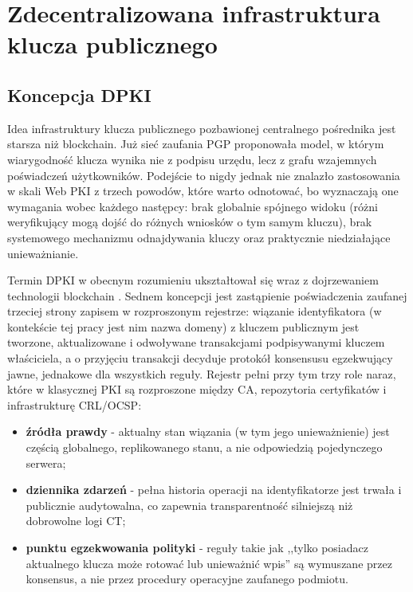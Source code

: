 \chapter{Zdecentralizowana infrastruktura klucza publicznego}
\label{ch:dpki}

\section{Koncepcja DPKI}
\label{sec:koncepcja-dpki}

Idea infrastruktury klucza publicznego pozbawionej centralnego pośrednika jest starsza niż blockchain. Już sieć zaufania PGP \cite{zimmermann1995pgp} proponowała model, w którym wiarygodność klucza wynika nie z podpisu urzędu, lecz z grafu wzajemnych poświadczeń użytkowników. Podejście to nigdy jednak nie znalazło zastosowania w skali Web PKI z trzech powodów, które warto odnotować, bo wyznaczają one wymagania wobec każdego następcy: brak globalnie spójnego widoku (różni weryfikujący mogą dojść do różnych wniosków o tym samym kluczu), brak systemowego mechanizmu odnajdywania kluczy oraz praktycznie niedziałające unieważnianie.

Termin DPKI w obecnym rozumieniu ukształtował się wraz z dojrzewaniem technologii blockchain \cite{allen2015dpki}. Sednem koncepcji jest zastąpienie poświadczenia zaufanej trzeciej strony zapisem w rozproszonym rejestrze: wiązanie identyfikatora (w kontekście tej pracy jest nim nazwa domeny) z kluczem publicznym jest tworzone, aktualizowane i odwoływane transakcjami podpisywanymi kluczem właściciela, a o przyjęciu transakcji decyduje protokół konsensusu egzekwujący jawne, jednakowe dla wszystkich reguły. Rejestr pełni przy tym trzy role naraz, które w klasycznej PKI są rozproszone między CA, repozytoria certyfikatów i infrastrukturę CRL/OCSP:
\begin{itemize}
    \item \textbf{źródła prawdy} - aktualny stan wiązania (w tym jego unieważnienie) jest częścią globalnego, replikowanego stanu, a nie odpowiedzią pojedynczego serwera;
    \item \textbf{dziennika zdarzeń} - pełna historia operacji na identyfikatorze jest trwała i publicznie audytowalna, co zapewnia transparentność silniejszą niż dobrowolne logi CT;
    \item \textbf{punktu egzekwowania polityki} - reguły takie jak ,,tylko posiadacz aktualnego klucza może rotować lub unieważnić wpis'' są wymuszane przez konsensus, a nie przez procedury operacyjne zaufanego podmiotu.
\end{itemize}

